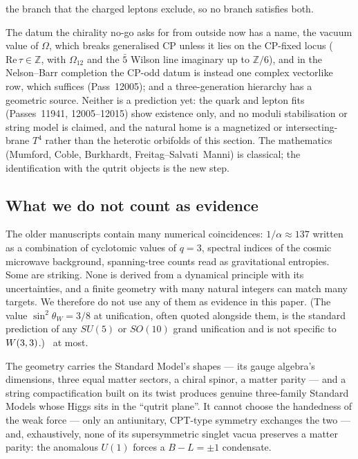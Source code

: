 the branch that the charged leptons exclude, so no branch satisfies both. 

\begin{boundary}
The datum the chirality no-go asks for from outside now has a name, the vacuum value of $\Omega$, which breaks
generalised CP unless it lies on the CP-fixed locus ($\mathrm{Re}\,\tau\in\mathbb Z$, with $\Omega_{12}$ and the $\bar5$ Wilson line imaginary up to $\mathbb Z/6$), and in the Nelson--Barr completion the CP-odd datum is instead one complex vectorlike row, which suffices (Pass~12005); and a three-generation hierarchy has a geometric source. Neither is a
prediction yet: the quark and lepton fits (Passes~11941, 12005--12015) show existence only, and no moduli stabilisation or string model is claimed, and the natural home is a magnetized or
intersecting-brane $T^4$ rather than the heterotic orbifolds of this section. The mathematics (Mumford, Coble,
Burkhardt, Freitag--Salvati~Manni) is classical; the identification with the qutrit objects is the new step. \tierB
\end{boundary}

\subsection{What we do not count as evidence}

The older manuscripts contain many numerical coincidences: $1/\alpha\approx137$ written as a
combination of cyclotomic values of $q=3$, spectral indices of the cosmic microwave
background, spanning-tree counts read as gravitational entropies. Some are striking. None
is derived from a dynamical principle with its uncertainties, and a finite geometry with
many natural integers can match many targets. We therefore do not use any of them as
evidence in this paper. (The value $\sin^2\theta_W=3/8$ at unification, often quoted
alongside them, is the standard prediction of any $SU(5)$ or $SO(10)$ grand unification and
is not specific to $W(3,3)$.) \tierB\ at most.

\begin{keyidea}
The geometry carries the Standard Model's shapes --- its gauge algebra's dimensions, three
equal matter sectors, a chiral spinor, a matter parity --- and a string compactification
built on its twist produces genuine three-family Standard Models whose Higgs sits in the
``qutrit plane''. It cannot choose the handedness of the weak force --- only an antiunitary,
CPT-type symmetry exchanges the two --- and, exhaustively, none of its supersymmetric singlet
vacua preserves a matter parity: the anomalous $U(1)$ forces a $B-L=\pm1$ condensate.
\end{keyidea}
